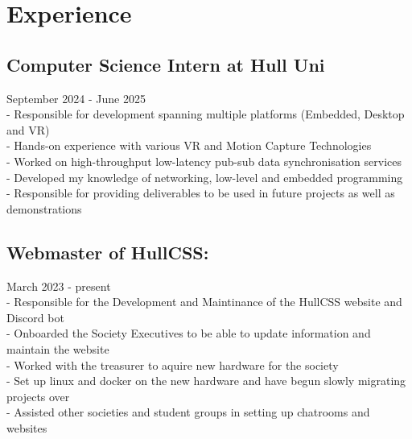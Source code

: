 \section{Experience}

\subsection{Computer Science Intern at Hull Uni} September 2024 - June 2025 \\
-\: Responsible for development spanning multiple platforms (Embedded, Desktop and VR) \\
-\: Hands-on experience with various VR and Motion Capture Technologies \\
-\: Worked on high-throughput low-latency pub-sub data synchronisation services \\
-\: Developed my knowledge of networking, low-level and embedded programming \\
-\: Responsible for providing deliverables to be used in future projects as well as demonstrations \\

\subsection{Webmaster of HullCSS:} March 2023 - present \\
-\: Responsible for the Development and Maintinance of the HullCSS website and Discord bot \\
-\: Onboarded the Society Executives to be able to update information and maintain the website \\
-\: Worked with the treasurer to aquire new hardware for the society \\
-\: Set up linux and docker on the new hardware and have begun slowly migrating projects over \\
-\: Assisted other societies and student groups in setting up chatrooms and websites \\

